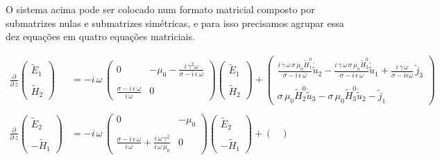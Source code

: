 O sistema acima pode ser colocado num formato matricial composto por submatrizes nulas e submatrizes sim\'etricas, e para isso precisamos agrupar essa dez equa\c{c}\~oes em quatro equa\c{c}\~oes matriciais.

\begin{align}\label{eq.matricial_1}
\frac{\partial}{\partial\,z}
\begin{pmatrix}
\tilde{E}_1\\\\
\tilde{H}_2
\end{pmatrix}
&=-i\,\omega\,
\begin{pmatrix}
0&-\mu_0-\frac{i\,\gamma^2\omega}{\sigma-i\,\epsilon\,\omega}\\\\
\frac{\sigma-i\,\epsilon\,\omega}{i\,\omega}&0
\end{pmatrix}
\begin{pmatrix}
\tilde{E}_1\\\\
\tilde{H}_2
\end{pmatrix}
+
\begin{pmatrix}
\frac{i\,\gamma\,\omega\,\sigma\,\mu_0\tilde{H}_1^0}{\sigma-i\,\epsilon\,\omega}\dot{\tilde{u}}_2-\frac{i\,\gamma\,\omega\,\sigma\,\mu_0\tilde{H}_2^0}{\sigma-i\,\epsilon\,\omega}\dot{\tilde{u}}_1+\frac{i\,\gamma\,\omega}{\sigma-i\epsilon\omega}\,\tilde{j}_3\\\\
\sigma\,\mu_0\tilde{H}_2^0\dot{\tilde{u}}_3-\sigma\,\mu_0\tilde{H}_3^0\dot{\tilde{u}}_2-\tilde{j}_1
\end{pmatrix}\\\nonumber\\\label{eq.matricial_2}
\frac{\partial}{\partial\,z}
\begin{pmatrix}
\tilde{E}_2\\\\
-\tilde{H}_1
\end{pmatrix}
&=-i\,\omega\,
\begin{pmatrix}
0&-\mu_0\\\\
\frac{\sigma-i\,\epsilon\,\omega}{i\,\omega}+\frac{i\,\omega\,\gamma^2}{i\,\omega\,\mu_0}&0
\end{pmatrix}
\begin{pmatrix}
\tilde{E}_2\\\\
-\tilde{H}_1
\end{pmatrix}
+
\begin{pmatrix}

\end{pmatrix}
\end{align}
